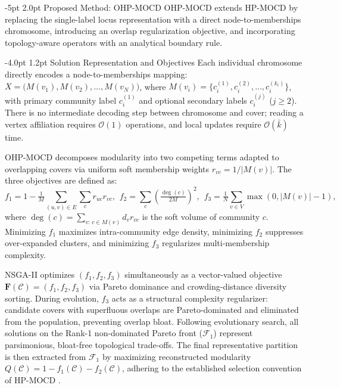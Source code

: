 \documentclass{svproc}
\makeatletter
\renewcommand\section{\@startsection{section}{1}{\z@}%
  {-5pt \@plus -1pt \@minus -0.5pt}%
  {2.0pt \@plus 0.5pt}%
  {\normalfont\large\bfseries\boldmath}}
\renewcommand\subsection{\@startsection{subsection}{2}{\z@}%
  {-4.0pt \@plus -0.5pt \@minus -0.5pt}%
  {1.2pt \@plus 0.5pt}%
  {\normalfont\normalsize\bfseries\boldmath}}
\makeatother
\begin{document}
\section{Proposed Method: OHP-MOCD}\label{sec:method}
OHP-MOCD extends HP-MOCD \cite{santos2025} by replacing the single-label locus representation with a direct node-to-memberships chromosome, introducing an overlap regularization objective, and incorporating topology-aware operators with an analytical boundary rule.

\subsection{Solution Representation and Objectives}\label{subsec:rep_and_obj}
Each individual chromosome directly encodes a node-to-memberships mapping: $X = \big(M(v_1), M(v_2), \dots, M(v_N)\big)$, where $M(v_i) = \{c_i^{(1)}, c_i^{(2)}, \dots, c_i^{(k_i)}\}$, with primary community label $c_i^{(1)}$ and optional secondary labels $c_i^{(j)}$ ($j \ge 2$). There is no intermediate decoding step between chromosome and cover; reading a vertex affiliation requires $\mathcal{O}(1)$ operations, and local updates require $\mathcal{O}(\bar{k})$ time.

OHP-MOCD decomposes modularity into two competing terms adapted to overlapping covers via uniform soft membership weights $r_{vc} = 1/|M(v)|$. The three objectives are defined as:
\begin{equation}\label{eq:objectives}
f_1 = 1 - \tfrac{1}{M}\!{\textstyle\sum\limits_{(u,v)\in E}}\!{\textstyle\sum\limits_{c}} r_{uc} r_{vc}, \hspace{5pt} f_2 = {\textstyle\sum\limits_{c}}\!\left(\tfrac{\deg(c)}{2M}\right)^{\!2}\!, \hspace{5pt} f_3 = \tfrac{1}{N}\!{\textstyle\sum\limits_{v \in V}} \max(0, |M(v)| - 1),
\end{equation}
where $\deg(c) = \sum_{v:\, c \in M(v)} d_v r_{vc}$ is the soft volume of community $c$. Minimizing $f_1$ maximizes intra-community edge density, minimizing $f_2$ suppresses over-expanded clusters, and minimizing $f_3$ regularizes multi-membership complexity.

NSGA-II optimizes $(f_1, f_2, f_3)$ simultaneously as a vector-valued objective $\mathbf{F}(\mathcal{C}) = (f_1, f_2, f_3)$ via Pareto dominance and crowding-distance diversity sorting. During evolution, $f_3$ acts as a structural complexity regularizer: candidate covers with superfluous overlaps are Pareto-dominated and eliminated from the population, preventing overlap bloat. Following evolutionary search, all solutions on the Rank-1 non-dominated Pareto front ($\mathcal{F}_1$) represent parsimonious, bloat-free topological trade-offs. The final representative partition is then extracted from $\mathcal{F}_1$ by maximizing reconstructed modularity $Q(\mathcal{C}) = 1 - f_1(\mathcal{C}) - f_2(\mathcal{C})$, adhering to the established selection convention of HP-MOCD \cite{santos2025}.
\end{document}
